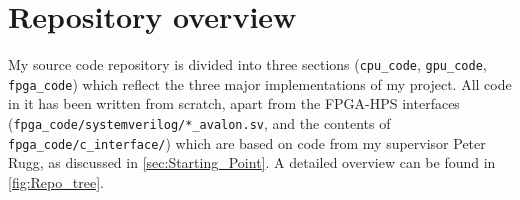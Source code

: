 \section{Repository overview}
\label{sec:Repo_overview}

My source code repository is divided into three sections (\lstinline{cpu_code}, \lstinline{gpu_code}, \lstinline{fpga_code}) which reflect the three major implementations of my project.
All code in it has been written from scratch, apart from the FPGA-HPS interfaces (\lstinline{fpga_code/systemverilog/*_avalon.sv}, and the contents of \lstinline{fpga_code/c_interface/}) which are based on code from my supervisor Peter Rugg, as discussed in \cref{sec:Starting_Point}.
A detailed overview can be found in \cref{fig:Repo_tree}.


